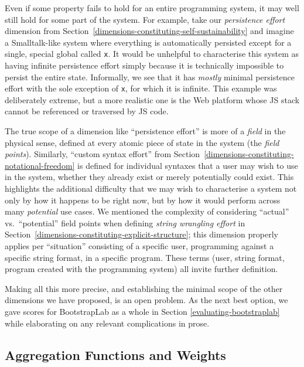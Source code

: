 \documentclass[ twoside,openright,titlepage,numbers=noenddot,headinclude,footinclude,cleardoublepage=empty,abstract=on,
                BCOR=5mm,paper=a4,fontsize=11pt
                ]{scrreprt}
\theoremstyle{definition}
\begin{document}
Even if some property fails to hold for an entire programming system, it
may well still hold for some part of the system. For example, take our
\emph{persistence effort} dimension from
Section~\ref{dimensions-constituting-self-sustainability} and imagine a
Smalltalk-like system where everything is automatically persisted except
for a single, special global called \texttt{x}. It would be unhelpful to
characterise this system as having infinite persistence effort simply
because it is technically impossible to persist the entire state.
Informally, we see that it has \emph{mostly} minimal persistence effort
with the sole exception of \texttt{x}, for which it is infinite. This
example was deliberately extreme, but a more realistic one is the Web
platform whose \ac{JS} stack cannot be referenced or traversed by
\ac{JS} code.

The true scope of a dimension like ``persistence effort'' is more of a
\emph{field} in the physical sense, defined at every atomic piece of
state in the system (the \emph{field points}). Similarly, ``custom
syntax effort'' from
Section~\ref{dimensions-constituting-notational-freedom} is defined for
individual syntaxes that a user may wish to use in the system, whether
they already exist or merely potentially could exist. This highlights
the additional difficulty that we may wish to characterise a system not
only by how it happens to be right now, but by how it would perform
across many \emph{potential} use cases. We mentioned the complexity of
considering ``actual'' vs.~``potential'' field points when defining
\emph{string wrangling effort} in
Section~\ref{dimensions-constituting-explicit-structure}; this dimension
properly applies per ``situation'' consisting of a specific user,
programming against a specific string format, in a specific program.
These terms (user, string format, program created with the programming
system) all invite further definition.

Making all this more precise, and establishing the minimal scope of the
other dimensions we have proposed, is an open problem. As the next best
option, we gave scores for BootstrapLab as a whole in Section
\ref{evaluating-bootstraplab} while elaborating on any relevant
complications in prose.

\hypertarget{aggregation-functions-and-weights}{\subsection{Aggregation Functions and
Weights}\label{aggregation-functions-and-weights}}
\end{document}
